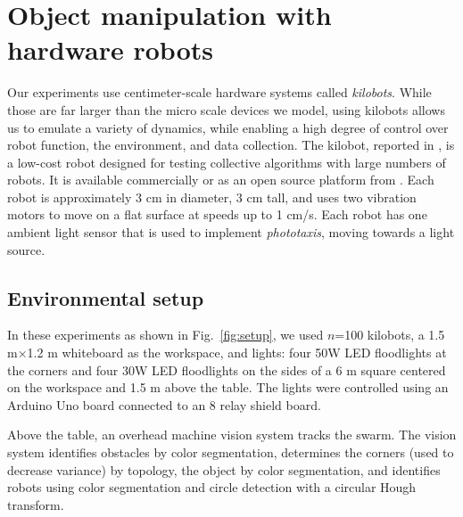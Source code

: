 
\section{Object manipulation with hardware robots}\label{sec:realExperiment}
Our experiments use centimeter-scale hardware systems called \emph{kilobots}.  While those are far larger than the micro scale devices we model, using kilobots allows us to emulate a variety of dynamics, while enabling a high degree of control over robot function, the environment, and data collection. The kilobot, reported in \cite{Rubenstein2012,rubenstein2014programmable}, is a low-cost robot designed for testing collective algorithms with large numbers of robots. It is available commercially or as an open source platform from \cite{K-Team2015}.  Each robot is approximately 3 cm in diameter, 3 cm tall, and uses two vibration motors to move on a flat surface at speeds up to 1 cm/s.  Each robot has one ambient light sensor that is used to implement \emph{phototaxis},  moving towards a light source. 

  
\subsection{Environmental setup}  
In these experiments as shown in Fig.~\ref{fig:setup}, we used $n$=100 kilobots, a 1.5 m$\times$1.2 m whiteboard as the workspace, and lights: four 50W LED floodlights  at the corners and four 30W LED floodlights on the sides of a 6 m square centered on the workspace and 1.5 m above the table. The lights were controlled using an Arduino Uno board connected to an 8 relay shield board.  

Above the table, an overhead machine vision system tracks the swarm. The vision system identifies obstacles by color segmentation, determines the corners  (used to decrease  variance)  by topology, the object by color segmentation, and identifies robots using color segmentation and circle detection with a circular Hough transform.

